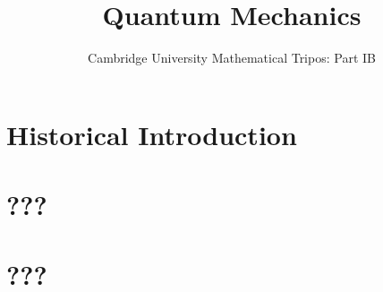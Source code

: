 \documentclass{article}
\title{Quantum Mechanics}
\author{Cambridge University Mathematical Tripos: Part IB}
\begin{document}
\maketitle

\tableofcontentsnewpage{}

\section{Historical Introduction}

\section{???}

\section{???}

\end{document}
